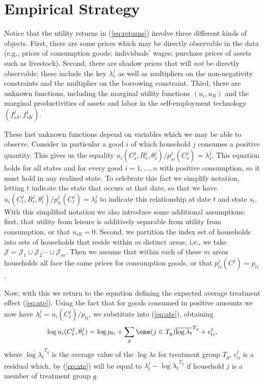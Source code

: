 \documentclass[11pt]{article}
\newcommand{\Eq}[1]{(\ref{eq:#1})}
\begin{document}
\section*{Empirical Strategy}
\label{sec-5}

Notice that the utility returns in \Eq{returns} involve three
different kinds of objects.  First, there are some prices which may be
directly observable in the data (e.g., prices of consumption goods;
individuals' wages; purchase prices of assets such as livestock).
Second, there are shadow prices that will \emph{not} be directly
observable; these include the key $\lambda^j_s$ as well as multipliers
on the non-negativity constraints and the multiplier on the borrowing
constraint.  Third, there are unknown functions, including the
marginal utility functions $(u_i,u_R)$ and the marginal productivities
of assets and labor in the self-employment technology
$(f^j_{sS},f^j_{sK})$.

These last unknown functions depend on variables which we may be able
to observe.  Consider in particular a good $i$ of which household $j$
consumes a positive quantity.  This gives us the equality
$u_{i}(C^j_s,R^j_s,\theta^j_s)/p^j_{si}(C^j_s)=\lambda^j_s$.  This
equation holds for all states and for every good $i=1,\dots,n$ with
positive consumption, so it must hold in any realized state.  To
celebrate this fact we simplify notation, letting $t$ indicate the
state that occurs at that date, so that we have
$u_{i}(C^j_t,R^j_t,\theta^j_t)/p^j_{ti}(C^j_t)=\lambda^j_t$ to
indicate this relationship at date $t$ and state $s_t$.  With this
simplified notation we also introduce some additional assumptions:
first, that utility from leisure is additively separable from utility
from consumption, or that $u_{iR}=0$.  Second, we partition the index
set of households into sets of households that reside within $m$
distinct areas; i.e., we take
$\mathcal{J}=\mathcal{J}_1\cup\mathcal{J}_2\cdots\cup\mathcal{J}_m$.
Then we assume that within each of these $m$ areas households all face
the same prices for consumption goods, or that $p^j_{ti}(C^j)=p_{ti}$.

Now, with this we return to the equation defining the expected average
treatment effect  \Eq{ate}.  Using the fact that for goods consumed in
positive amounts we now have
$\lambda^j_t=u_i(C^j_t)/p_{ti}$, we substitute into \Eq{ate},
obtaining
\[
   \log u_i(C^j_t,\theta^j_t) = \log p_{ti} + \sum_g\one(j\in T_g)\overline{\log\lambda_t}^{T_g} + \epsilon^j_{ti},
\]
where $\overline{\log\lambda_t}^{T_g}$ is the average value of the
\(\log\lambda\)s for treatment group $T_g$,
$\epsilon^j_{ti}$ is a residual which, by \Eq{ate} will be equal to
$\lambda^j_t-\overline{\log\lambda_t}^{T_g}$ if household \(j\) is a member
of treatment group $g$.
\end{document}
